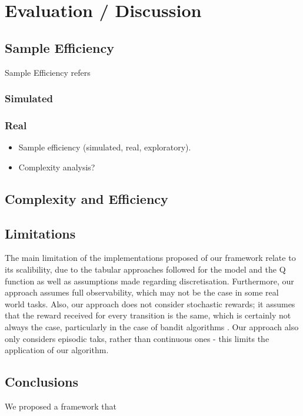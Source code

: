 \chapter{Evaluation / Discussion}
\label{chapter6}
\section{Sample Efficiency}
Sample Efficiency refers 
\subsection{Simulated}
\subsection{Real}
\begin{itemize}
    \item Sample efficiency (simulated, real, exploratory).
    \item Complexity analysis?
\end{itemize}
\section{Complexity and Efficiency}
\section{Limitations}
The main limitation of the implementations proposed of our framework relate to its scalibility, due to the tabular approaches followed for the model and the Q function as well as assumptions made regarding discretisation. Furthermore, our approach assumes full observability, which may not be the case in some real world tasks. Also, our approach does not consider stochastic rewards; it assumes that the reward received for every transition is the same, which is certainly not always the case, particularly in the case of bandit algorithms \citep{lattimore}. Our approach also only considers episodic taks, rather than continuous ones - this limits the application of our algorithm.
\section{Conclusions}
We proposed a framework that 
